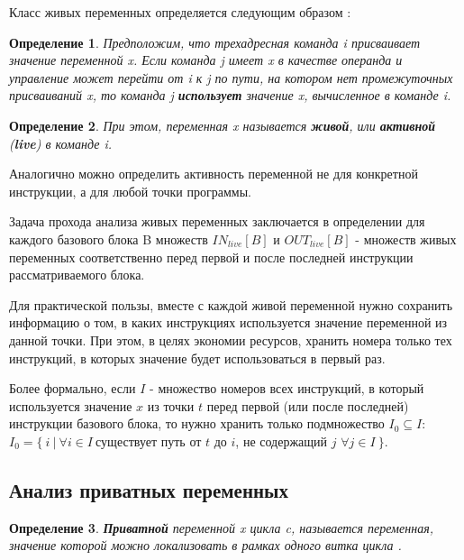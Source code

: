 \documentclass{article}
\begin{document}
Класс живых переменных определяется следующим образом \cite[643]{dragonbook}:

\newtheorem{defenition}{Определение}[subsection]

\begin{defenition}
    Предположим, что трехадресная команда i присваивает значение переменной x. Если команда j имеет x в качестве операнда и управление может
    перейти от i к j по пути, на котором нет промежуточных присваиваний x, то
    команда j \textbf{использует} значение x, вычисленное в команде i.
\end{defenition}

\begin{defenition}
    При этом, переменная x называется \textbf{живой}, или \textbf{активной} (\textbf{live}) в команде i.
\end{defenition}

Аналогично можно определить активность переменной не для конкретной инструкции, а для любой точки программы.

Задача прохода анализа живых переменных заключается в определении для каждого базового блока B множеств $IN_{live}[B]$ и $OUT_{live}[B]$ - множеств живых переменных соответственно перед первой и после последней инструкции рассматриваемого блока.

Для практической пользы, вместе с каждой живой переменной нужно сохранить информацию о том, в каких инструкциях используется значение переменной из данной точки. При этом, в целях экономии ресурсов, 
хранить номера только тех инструкций, в которых значение будет использоваться в первый раз.

Более формально, если $I$ - множество номеров всех инструкций, в который используется значение $x$ из точки $t$ перед первой (или после последней) инструкции базового блока, 
то нужно хранить только подмножество $I_0 \subseteq I$:\\

$I_0 = \{\ i \ |\ \forall i \in I\ $существует путь от $t$ до $i$, не содержащий $j$ $ \forall j \in I\ \}$.

\subsection{Анализ приватных переменных}

\begin{defenition}
    \textbf{Приватной} переменной x цикла c, называется переменная, значение которой можно локализовать в рамках одного витка цикла \cite{pri-var}. 
\end{defenition}
\end{document}
